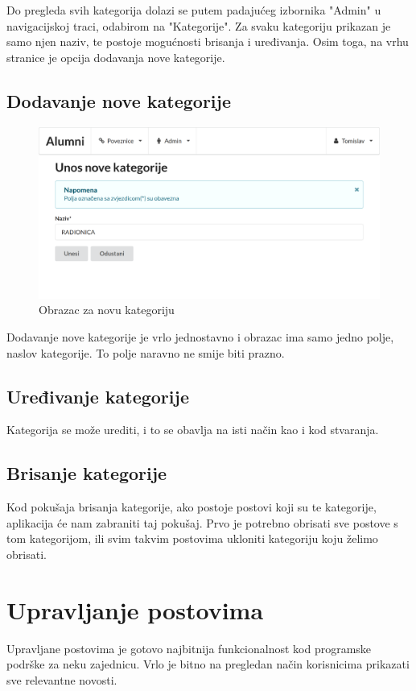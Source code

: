 \documentclass[zavrsni, numeric]{fer}
\begin{document}
Do pregleda svih kategorija dolazi se putem padajućeg izbornika "Admin" u navigacijskoj traci, odabirom na "Kategorije". Za svaku kategoriju prikazan je samo njen naziv, te postoje mogućnosti brisanja i uređivanja. Osim toga, na vrhu stranice je opcija dodavanja nove kategorije.

\subsection{Dodavanje nove kategorije}

\begin{figure}[H]
	\centering
	\includegraphics[width=13cm]{slike/nova-kategorija.png}
	\caption{Obrazac za novu kategoriju}
	\label{fig:nova-kategorija}
\end{figure}

Dodavanje nove kategorije je vrlo jednostavno i obrazac ima samo jedno polje, naslov kategorije. To polje naravno ne smije biti prazno.

\subsection{Uređivanje kategorije}
Kategorija se može urediti, i to se obavlja na isti način kao i kod stvaranja.

\subsection{Brisanje kategorije}
Kod pokušaja brisanja kategorije, ako postoje postovi koji su te kategorije, aplikacija će nam zabraniti taj pokušaj. Prvo je potrebno obrisati sve postove s tom kategorijom, ili svim takvim postovima ukloniti kategoriju koju želimo obrisati.

\section{Upravljanje postovima}
Upravljane postovima je gotovo najbitnija funkcionalnost kod programske podrške za neku zajednicu. Vrlo je bitno na pregledan način korisnicima prikazati sve relevantne novosti.
\end{document}
